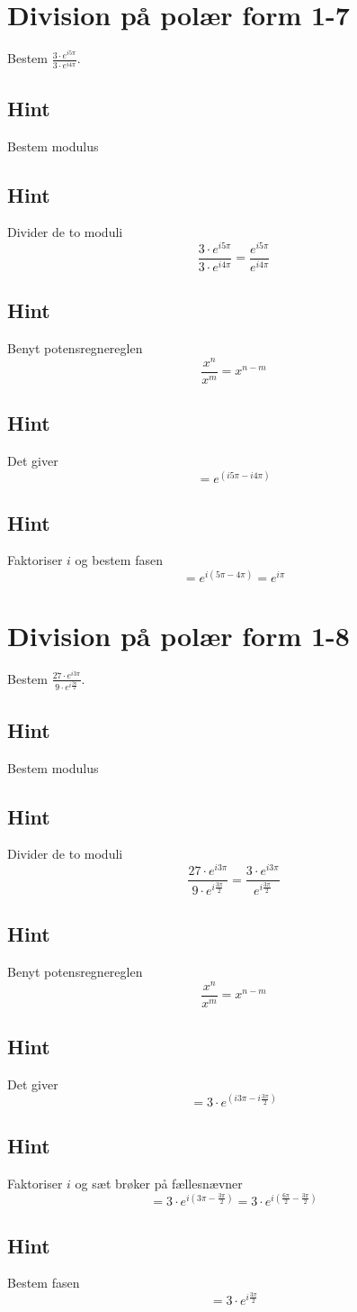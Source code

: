 \documentclass{article}
\newenvironment{exercise}[1]{\newpage\section{#1}}{}
\newcommand{\answerbox}[1]{\fbox{$#1$}}
\newcommand{\hint}{\subsection*{Hint}}
\begin{document}
\newpage

\begin{exercise}{Division på polær form 1-7}
	
	Bestem $ \frac{3 \cdot e^{i 5\pi}}{3 \cdot e^{i 4\pi}}$.
	
	\answerbox{e^{i \pi}}
	
	
	\hint 
	
	Bestem modulus
	
	
	\hint
	
	Divider de to moduli
	\[
	\frac{3 \cdot e^{i 5\pi}}{3 \cdot e^{i 4\pi}} = \frac{e^{i 5\pi}}{e^{i 4\pi}}
	\]
	
	\hint 
	
	Benyt potensregnereglen
	\[
	\frac{x^n}{x^m} = x^{n-m}
	\]
	
	\hint
	
	Det giver
	\[
	= e^{(i 5\pi - i 4\pi)}	
	\]
	
	\hint
	
	Faktoriser $i$ og bestem fasen
	\[
	=  e^{i(5\pi - 4\pi)} = e^{i \pi}
	\]
	
	
\end{exercise}

\newpage

\begin{exercise}{Division på polær form 1-8}
	
	Bestem $ \frac{27\cdot e^{i 3 \pi}}{9 \cdot e^{i \frac{3 \pi}{2}}}$.
	
	\answerbox{3 \cdot e^{i \frac{3\pi}{2}}}
	
	
	\hint 
	
	Bestem modulus
	
	
	\hint
	
	Divider de to moduli
	\[
	\frac{27\cdot e^{i 3 \pi}}{9 \cdot e^{i \frac{3 \pi}{2}}} = \frac{3\cdot e^{i 3 \pi}}{ e^{i \frac{3 \pi}{2}}}
	\]
	
	\hint 
	
	Benyt potensregnereglen
	\[
	\frac{x^n}{x^m} = x^{n-m}
	\]
	
	\hint
	
	Det giver
	\[
	=3\cdot e^{(i 3 \pi- i \frac{3 \pi}{2})} 
	\]
	
	\hint
	
	Faktoriser $i$ og sæt brøker på fællesnævner
	\[
	= 3\cdot e^{i( 3 \pi- \frac{3 \pi}{2})}  = 3 \cdot e^{i( \frac{6 \pi}{2}- \frac{3 \pi}{2})} 
	\]
	
	\hint
	
	Bestem fasen
	\[
	= 3 \cdot e^{i \frac{3\pi}{2}}
	\]
	
\end{exercise}
\end{document}
